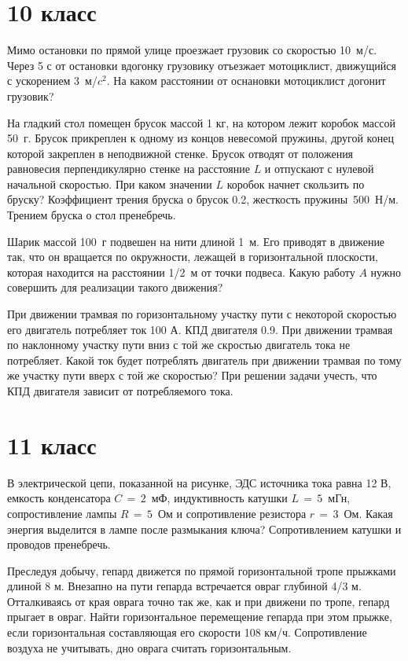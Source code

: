 \section{10 класс}

\AddProb Мимо остановки по прямой улице проезжает грузовик со скоростью 10~м/с. Через 5 с от остановки вдогонку грузовику отъезжает мотоциклист, 
движущийся с ускорением 3~м/$c{^2}$. На каком расстоянии от оснановки мотоциклист догонит грузовик?

\AddProb На гладкий стол помещен брусок массой 1 кг, на котором лежит коробок массой 50~г. Брусок прикреплен к одному из концов невесомой пружины, 
другой конец которой закреплен в неподвижной стенке. Брусок отводят от положения равновесия перпендикулярно стенке на расстояние $L$ 
и отпускают с нулевой начальной скоростью. При каком значении $L$ коробок начнет скользить по бруску? 
Коэффициент трения бруска о брусок 0.2, жесткость пружины~500~Н/м. Трением бруска о стол пренебречь.

\AddProb Шарик массой 100~г подвешен на нити длиной 1~м. Его приводят в движение так, что он вращается по окружности, лежащей в горизонтальной плоскости, 
которая находится на расстоянии 1/2~м от точки подвеса. Какую работу $A$ нужно совершить для реализации такого движения?

\AddProb При движении трамвая по горизонтальному участку пути с некоторой скоростью его двигатель потребляет ток 100 А. КПД двигателя 0.9. 
При движении трамвая по наклонному участку пути вниз с той же скростью двигатель тока не потребляет. Какой ток будет потреблять двигатель при 
движении трамвая по тому же участку пути вверх с той же скоростью? При решении задачи учесть, что КПД двигателя зависит от потребляемого тока.



\section{11 класс}

\AddProb В электрической цепи, показанной на рисунке, ЭДС источника тока равна 12 В, емкость конденсатора $C\,=\,2$~мФ, 
индуктивность катушки $L\,=\,5$~мГн, сопростивление лампы $R\,=\,5$~Ом и сопротивление резистора $r\,=\,3$~Ом. 
Какая энергия выделится в лампе после размыкания ключа? Сопротивлением катушки и проводов пренебречь.

\AddProb Преследуя добычу, гепард движется по прямой горизонтальной тропе прыжками длиной 8 м. Внезапно на пути гепарда встречается овраг глубиной 4/3 м. 
Отталкиваясь от края оврага точно так же, как и при движени по тропе, гепард прыгает в овраг. Найти горизонтальное перемещение гепарда при этом прыжке, 
если горизонтальная составляющая его скорости 108 км/ч. Сопротивление воздуха не учитывать, дно оврага считать горизонтальным.

